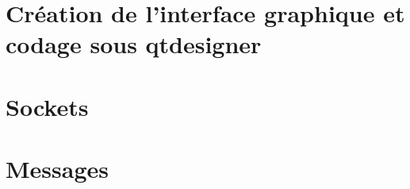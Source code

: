 \section{Création de l'interface graphique et codage sous qtdesigner}



\section{Sockets}



\section{Messages}


